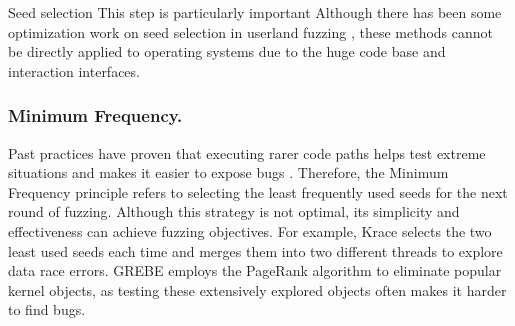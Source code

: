 Seed selection  This step is particularly important  Although there has been some optimization work on seed selection in userland fuzzing \cite{Rebert2014OptimizingSS, Woo2013SchedulingBM, Zhao2019SendHP}, these methods cannot be directly applied to operating systems due to the huge code base and  interaction interfaces. 

\subsubsection{Minimum Frequency.}
Past practices have proven that executing rarer code paths helps test extreme situations and makes it easier to expose bugs \cite{Bx00F6hme2016CoverageBasedGF, Lemieux2017FairFuzzAT}. Therefore, the Minimum Frequency principle refers to selecting the least frequently used seeds for the next round of fuzzing. Although this strategy is not optimal, its simplicity and effectiveness can achieve fuzzing objectives. For example, Krace \cite{xu2020krace} selects the two least used seeds each time and merges them into two different threads to explore data race errors. GREBE \cite{lin2022grebe} employs the PageRank \cite{Brin1998PageRank} algorithm to eliminate popular kernel objects, as testing these extensively explored objects often makes it harder to find bugs. 




